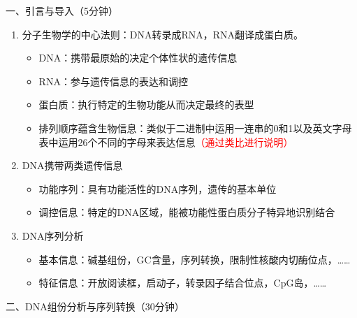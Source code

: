 \documentclass{TIJMUjiaoanLL}
\begin{document}
\noindent
一、引言与导入（5分钟）
\begin{enumerate}
  \item 分子生物学的中心法则：DNA转录成RNA，RNA翻译成蛋白质。
    \begin{itemize}
      \item DNA：携带最原始的决定个体性状的遗传信息
      \item RNA：参与遗传信息的表达和调控
      \item 蛋白质：执行特定的生物功能从而决定最终的表型
      \item 排列顺序蕴含生物信息：类似于二进制中运用一连串的0和1以及英文字母表中运用26个不同的字母来表达信息\textcolor{red}{（通过类比进行说明）}
    \end{itemize}
  \item DNA携带两类遗传信息
    \begin{itemize}
      \item 功能序列：具有功能活性的DNA序列，遗传的基本单位
      \item 调控信息：特定的DNA区域，能被功能性蛋白质分子特异地识别结合
    \end{itemize}
  \item DNA序列分析
    \begin{itemize}
      \item 基本信息：碱基组份，GC含量，序列转换，限制性核酸内切酶位点，……
      \item 特征信息：开放阅读框，启动子，转录因子结合位点，CpG岛，……
    \end{itemize}
\end{enumerate}

\vspace*{0.2cm}
\noindent
二、DNA组份分析与序列转换（30分钟）
\end{document}
